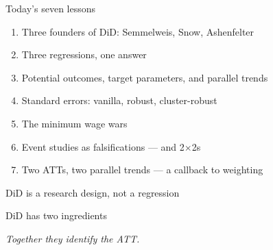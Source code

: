 \documentclass[aspectratio=169,11pt]{beamer}
\begin{document}
\begin{frame}{Today's seven lessons}
\vspace{0.3em}
\begin{enumerate}
  \item Three founders of DiD: Semmelweis, Snow, Ashenfelter
  \item Three regressions, one answer
  \item Potential outcomes, target parameters, and parallel trends
  \item Standard errors: vanilla, robust, cluster-robust
  \item The minimum wage wars
  \item Event studies as falsifications --- and 2{$\times$}2s
  \item Two ATTs, two parallel trends --- a callback to weighting
\end{enumerate}
\end{frame}


\begin{frame}{DiD is a research design, not a regression}
\vspace{1.2em}
\end{frame}

\begin{frame}{DiD has two ingredients}
\vspace{0.4em}
\begin{center}
\end{center}
\vspace{0.8em}
\begin{center}
\small\color{warmgray}\itshape Together they identify the ATT.
\end{center}
\end{frame}
\end{document}
